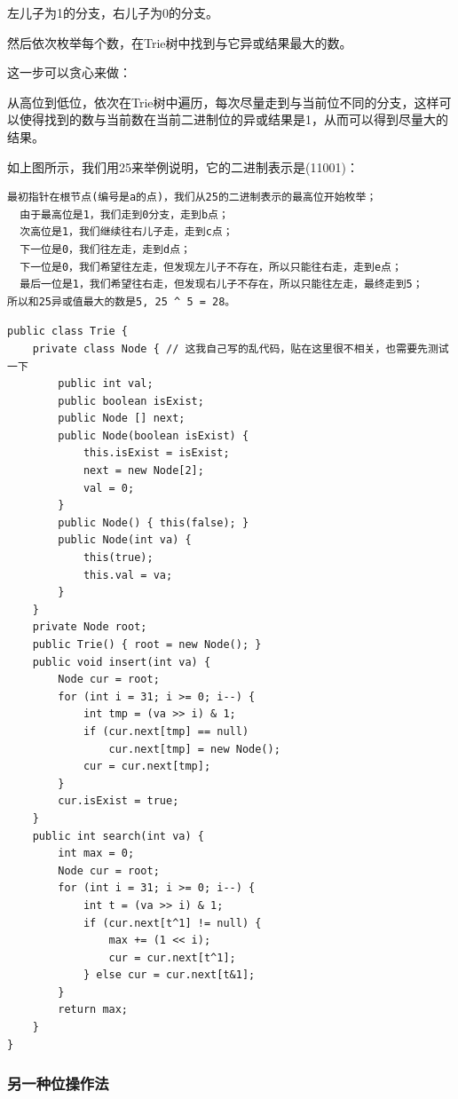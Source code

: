 \documentclass[9pt, b5paper]{article}
\begin{document}
左儿子为1的分支，右儿子为0的分支。

然后依次枚举每个数，在Trie树中找到与它异或结果最大的数。

这一步可以贪心来做：

从高位到低位，依次在Trie树中遍历，每次尽量走到与当前位不同的分支，这样可以使得找到的数与当前数在当前二进制位的异或结果是1，从而可以得到尽量大的结果。

如上图所示，我们用25来举例说明，它的二进制表示是(11001)：

\begin{verbatim}
最初指针在根节点(编号是a的点)，我们从25的二进制表示的最高位开始枚举；
  由于最高位是1，我们走到0分支，走到b点；
  次高位是1，我们继续往右儿子走，走到c点；
  下一位是0，我们往左走，走到d点；
  下一位是0，我们希望往左走，但发现左儿子不存在，所以只能往右走，走到e点；
  最后一位是1，我们希望往右走，但发现右儿子不存在，所以只能往左走，最终走到5；
所以和25异或值最大的数是5, 25 ^ 5 = 28。
\end{verbatim}
\begin{verbatim}
public class Trie {
    private class Node { // 这我自己写的乱代码，贴在这里很不相关，也需要先测试一下
        public int val;
        public boolean isExist;
        public Node [] next;
        public Node(boolean isExist) {
            this.isExist = isExist;
            next = new Node[2];
            val = 0;
        }
        public Node() { this(false); }
        public Node(int va) {
            this(true);
            this.val = va;
        }
    }
    private Node root;
    public Trie() { root = new Node(); }
    public void insert(int va) {
        Node cur = root;
        for (int i = 31; i >= 0; i--) {
            int tmp = (va >> i) & 1;
            if (cur.next[tmp] == null)
                cur.next[tmp] = new Node();
            cur = cur.next[tmp];
        }
        cur.isExist = true;
    }
    public int search(int va) {
        int max = 0;
        Node cur = root;
        for (int i = 31; i >= 0; i--) {
            int t = (va >> i) & 1;
            if (cur.next[t^1] != null) {
                max += (1 << i);
                cur = cur.next[t^1];
            } else cur = cur.next[t&1];
        }
        return max;
    }
}
\end{verbatim}

\subsubsection{另一种位操作法}
\label{sec-13-5-1}
\end{document}
